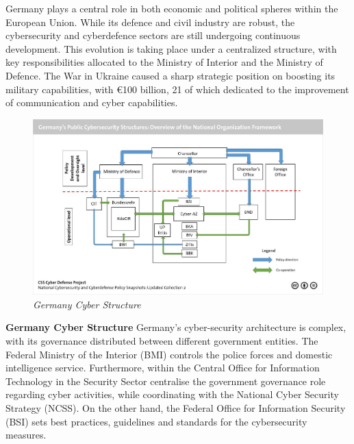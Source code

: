 Germany plays a central role in both economic and political spheres within the European Union. While its defence and civil industry are robust, the cybersecurity and cyberdefence sectors are still undergoing continuous development. This evolution is taking place under a centralized structure, with key responsibilities allocated to the Ministry of Interior and the Ministry of Defence. The War in Ukraine caused a sharp strategic position on boosting its military capabilities, with €100 billion, 21 of which dedicated to the improvement of communication and cyber capabilities. 

\begin{figure}[H]
    \centering
    \includegraphics[width=1\textwidth]{Images/germany.jpg}
    \caption{\textit{Germany Cyber Structure}}
    \label{fig:germany}
\end{figure}

\textbf{Germany Cyber Structure} Germany's cyber-security architecture is complex, with its governance distributed between different government entities. The Federal Ministry of the Interior (BMI) controls the police forces and domestic intelligence service. Furthermore, within the Central Office for Information Technology in the Security Sector centralise the government governance role regarding cyber activities, while coordinating with the National Cyber Security Strategy (NCSS). On the other hand, the Federal Office for Information Security (BSI) sets best practices, guidelines and standards for the cybersecurity measures. \autocite{theinternationalinstituteforstrategicstudies_2023_cyber, federalministryoftheinteriorbuildingandcommunity_2021_cyber}

